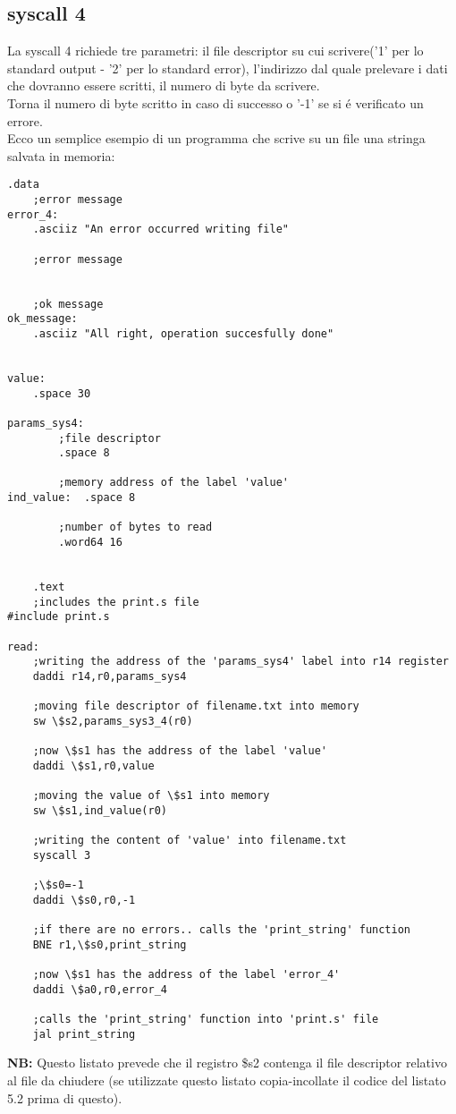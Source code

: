 \documentclass[12pt]{report}
\newcommand{\OF}{\textbf{NB:} Questo listato prevede che il registro \$s2 contenga il file descriptor
relativo al file da chiudere (se utilizzate questo listato copia-incollate il codice del listato 5.2 prima di questo).}
\begin{document}
\subsection{syscall 4}
La syscall 4 richiede tre parametri: il file descriptor su cui scrivere('1' per lo standard output - '2' per lo standard error), 
l’indirizzo dal quale prelevare i dati che dovranno essere scritti, il numero di byte da scrivere.\\
Torna il numero di byte scritto in caso di successo o '-1' se si \'{e} verificato un errore.\\ 
Ecco un semplice esempio di un programma che scrive su un file una stringa salvata in memoria:
\begin{lstlisting}[caption={syscall4}, label={code:syscall4}, style={mips}]
      		.data
	;error message
error_4:	
	.asciiz "An error occurred writing file"	

	;error message


	;ok message
ok_message:	
	.asciiz "All right, operation succesfully done"	


value:		
	.space 30					

params_sys4:	
		;file descriptor		
		.space 8	
		
		;memory address of the label 'value'				
ind_value:	.space 8

		;number of bytes to read					
		.word64 16					


	.text
	;includes the print.s file
#include print.s	

read:
	;writing the address of the 'params_sys4' label into r14 register
	daddi r14,r0,params_sys4	

	;moving file descriptor of filename.txt into memory
	sw \$s2,params_sys3_4(r0)

	;now \$s1 has the address of the label 'value'
	daddi \$s1,r0,value

	;moving the value of \$s1 into memory			
	sw \$s1,ind_value(r0)	

	;writing the content of 'value' into filename.txt			
	syscall 3			
	
	;\$s0=-1
	daddi \$s0,r0,-1			

	;if there are no errors.. calls the 'print_string' function	
	BNE r1,\$s0,print_string

	;now \$s1 has the address of the label 'error_4'		
	daddi \$a0,r0,error_4

	;calls the 'print_string' function into 'print.s' file
	jal print_string				
\end{lstlisting}
\OF{}
\end{document}
